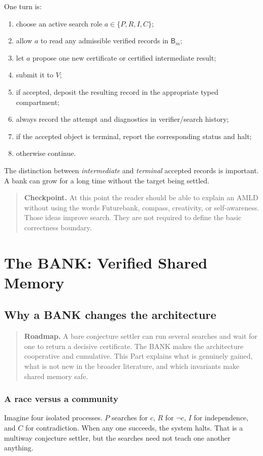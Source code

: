 \documentclass[11pt,openany]{book}
\theoremstyle{definition}
\theoremstyle{remark}
\newenvironment{roadmap}{\begin{quote}\small\color{deepblue}\textbf{Roadmap.} }{\end{quote}}
\newenvironment{checkpoint}{\begin{quote}\small\color{black}\textbf{Checkpoint.} }{\end{quote}}
\newcommand{\Bank}{\mathsf{B}}
\begin{document}
One turn is:
\begin{enumerate}
\item choose an active search role $a\in\{P,R,I,C\}$;
\item allow $a$ to read any admissible verified records in $\Bank_m$;
\item let $a$ propose one new certificate or certified intermediate result;
\item submit it to $V$;
\item if accepted, deposit the resulting record in the appropriate typed compartment;
\item always record the attempt and diagnostics in verifier/search history;
\item if the accepted object is terminal, report the corresponding status and halt;
\item otherwise continue.
\end{enumerate}

The distinction between \emph{intermediate} and \emph{terminal} accepted records is important. A bank can grow for a long time without the target being settled.

\begin{checkpoint}
At this point the reader should be able to explain an AMLD without using the words Futurebank, compass, creativity, or self-awareness. Those ideas improve search. They are not required to define the basic correctness boundary.
\end{checkpoint}

\part{The BANK: Verified Shared Memory}

\chapter{Why a BANK changes the architecture}
\begin{roadmap}
A bare conjecture settler can run several searches and wait for one to return a decisive certificate. The BANK makes the architecture cooperative and cumulative. This Part explains what is genuinely gained, what is not new in the broader literature, and which invariants make shared memory safe.
\end{roadmap}

\section{A race versus a community}
Imagine four isolated processes. $P$ searches for $c$, $R$ for $\neg c$, $I$ for independence, and $C$ for contradiction. When any one succeeds, the system halts. That is a multiway conjecture settler, but the searches need not teach one another anything.
\end{document}
